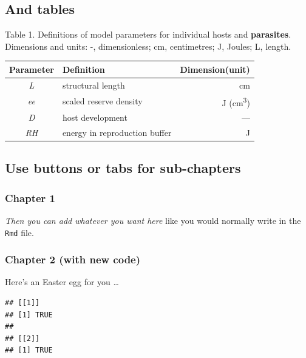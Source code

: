 \documentclass[portrait]{article}
\begin{document}
\subsection{And tables}\label{and-tables}

Table 1. Definitions of model parameters for individual hosts and
\textbf{parasites}. Dimensions and units: -, dimensionless; cm,
centimetres; J, Joules; L, length.

\begin{longtable}[]{@{}clr@{}}
\toprule
Parameter & Definition & Dimension(unit)\tabularnewline
\midrule
\endhead
\emph{L} & structural length & cm\tabularnewline
\emph{ee} & scaled reserve density & J
(cm\textsuperscript{3})\tabularnewline
\emph{D} & host development & ---\tabularnewline
\emph{RH} & energy in reproduction buffer & J\tabularnewline
\bottomrule
\end{longtable}

\newpage  

\subsection{Use buttons or tabs for
sub-chapters}\label{use-buttons-or-tabs-for-sub-chapters}

\subsubsection{Chapter 1}\label{chapter-1}

\emph{Then you can add whatever you want here} like you would normally
write in the \texttt{Rmd} file.\\
\hspace*{0.333em}

\subsubsection{Chapter 2 (with new code)}\label{chapter-2-with-new-code}

Here's an Easter egg for you \ldots{}

\begin{verbatim}
## [[1]]
## [1] TRUE
## 
## [[2]]
## [1] TRUE
\end{verbatim}
\end{document}
